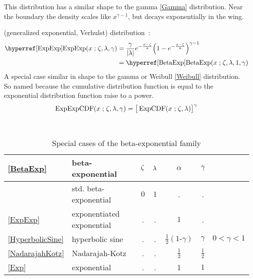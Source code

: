 This distribution has a similar shape to the gamma \eqref{Gamma} distribution. Near the boundary the density scales like $x^{\gamma-1}$, but decays exponentially in the wing.






 (generalized exponential, Verhulst) distribution~\cite{Verhulst1847,Ahuja1967,Gupta2001}:
\begin{align}
\label{ExpExp}
\opr{ExpExp}(x\given \pLoc,\pScale,\gamma) 
 &=  \frac{\gamma}{ \Left|\pScale\Right|}
 e^{- \frac{x-\pLoc}{\pScale} }  \Left(1 - e^{-\frac{x-\pLoc}{\pScale}  }\Right)^{\gamma-1} \checked
\\ & = \opr{BetaExp}(x\given \pLoc,\pScale,1, \gamma) \notag \checked
\end{align}
A special case similar in shape to the gamma or Weibull \eqref{Weibull} distribution. So named because the cumulative distribution function is equal to the exponential distribution function raise to a power.
\[
\op{ExpExpCDF}(x\given \pLoc,\pScale,\gamma) = \big[\op{ExpCDF}(x\given \pLoc,\pScale)\big]^{\gamma}
\checked
\notag
\]


\begin{table*}[bt]
\begin{center}
\caption[Beta-exponential distribution -- Special cases]{Special cases of the beta-exponential family}
~\\
{\renewcommand{\arraystretch}{1.25} 
\begin{tabular}{llccccl}
\eqref{BetaExp} & beta-exponential & $\zeta$ & $\lambda$ & $\alpha$ &  $\gamma$ \\
\hline  
 	& std. beta-exponential & $0$ & $1$ & . & . \\
\eqref{ExpExp} 		& exponentiated exponential & . & . & $1$ & . \\
\eqref{HyperbolicSine} & hyperbolic sine 	& . & .  & $\tfrac{1}{2}(1\text{-}\gamma)$ & $\gamma$ & $0<\gamma<1$ \\
\eqref{NadarajahKotz} &  Nadarajah-Kotz 	& . & . & $\tfrac{1}{2}$ & $\tfrac{1}{2}$ \\
\eqref{Exp} & exponential & . & . & 1 & $1$ \\
\end{tabular} }
\end{center}
\end{table*}



